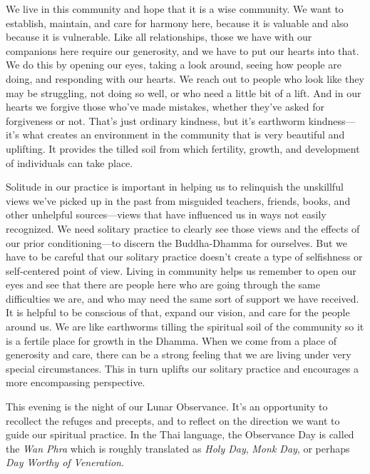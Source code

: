 We live in this community and hope that it is a wise community. We want 
to establish, maintain, and care for harmony here, because it is 
valuable and also because it is vulnerable. Like all relationships, 
those we have with our companions here require our generosity, and we 
have to put our hearts into that. We do this by opening our eyes, 
taking a look around, seeing how people are doing, and responding with 
our hearts. We reach out to people who look like they may be 
struggling, not doing so well, or who need a little bit of a lift. And 
in our hearts we forgive those who've made mistakes, whether they've 
asked for forgiveness or not. That's just ordinary kindness, but it's 
earthworm kindness---it's what creates an environment in the community 
that is very beautiful and uplifting. It provides the tilled soil from 
which fertility, growth, and development of individuals can take place.

Solitude in our practice is important in helping us to relinquish the 
unskillful views we've picked up in the past from misguided teachers, 
friends, books, and other unhelpful sources---views that have 
influenced us in ways not easily recognized. We need solitary practice 
to clearly see those views and the effects of our prior 
conditioning---to discern the Buddha-Dhamma for ourselves. But we have 
to be careful that our solitary practice doesn't create a type of 
selfishness or self-centered point of view. Living in community helps 
us remember to open our eyes and see that there are people here who are 
going through the same difficulties we are, and who may need the same 
sort of support we have received. It is helpful to be conscious of 
that, expand our vision, and care for the people around us. We are like 
earthworms tilling the spiritual soil of the community so it is a 
fertile place for growth in the Dhamma. When we come from a place of 
generosity and care, there can be a strong feeling that we are living 
under very special circumstances. This in turn uplifts our solitary 
practice and encourages a more encompassing perspective.


This evening is the night of our Lunar Observance. It's an opportunity 
to recollect the refuges and precepts, and to reflect on the direction 
we want to guide our spiritual practice. In the Thai language, the 
Observance Day is called the \emph{Wan Phra} which is roughly 
translated as \emph{Holy Day}, \emph{Monk Day}, or perhaps \emph{Day 
Worthy of Veneration}.

